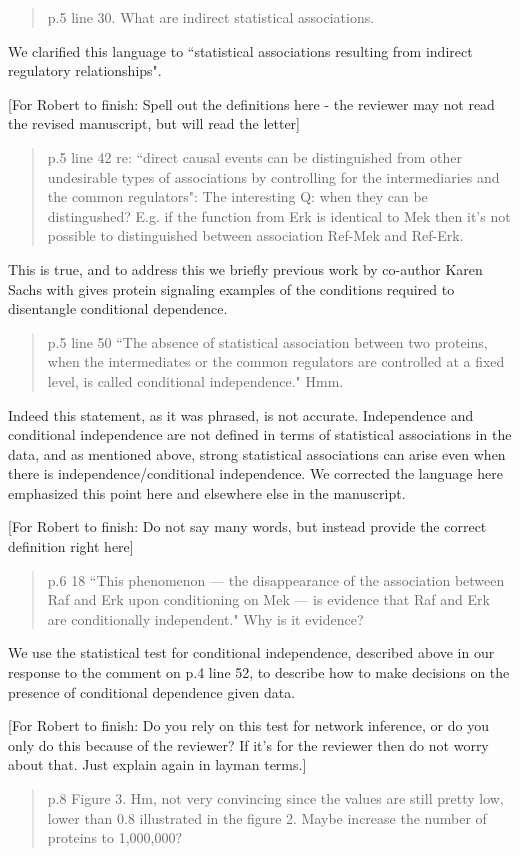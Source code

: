 \documentclass{letter}[11]
\def\todo#1{{\color{red}[For Robert to finish: #1]}}
\def\r#1{{\begin{quote}\textsf{\color{blue} #1}\end{quote}}}
\begin{document}
\r{p.5 line 30.  What are indirect statistical associations.}

We clarified this language to ``statistical associations resulting from indirect regulatory relationships".

\todo{Spell out the definitions here - the reviewer may not read the revised manuscript, but will read the letter}


\r{p.5 line 42 re: ``direct causal events can be distinguished from other undesirable types of associations by controlling for the intermediaries and the common regulators":  The interesting Q: when they can be distingushed? E.g. if the function from Erk is identical to Mek then it's not possible to distinguished between association Ref-Mek and Ref-Erk.}

This is true, and to address this we briefly previous work by co-author Karen Sachs with gives protein signaling examples of the conditions required to disentangle conditional dependence.

\r{p.5 line 50 ``The absence of statistical association between two proteins, when the intermediates or the common regulators are controlled at a fixed level, is called conditional independence." Hmm.}

Indeed this statement, as it was phrased, is not accurate.  Independence and conditional independence are not defined in terms of statistical associations in the data, and as mentioned above, strong statistical associations can arise even when there is independence/conditional independence.  We corrected the language here emphasized this point here and elsewhere else in the manuscript.

\todo{Do not say many words, but instead provide the correct definition right here}

\r{p.6 18 ``This phenomenon --- the disappearance of the association between Raf and Erk upon conditioning on Mek --- is evidence that Raf and Erk are conditionally independent."  Why is it evidence?}

We use the statistical test for conditional independence, described above in our response to the comment on p.4 line 52, to describe how to make decisions on the presence of conditional dependence  given data.

\todo{Do you rely on this test for network inference, or do you only do this because of the reviewer? If it's for the reviewer then do not worry about that. Just explain again in layman terms.}

\r{p.8 Figure 3.  Hm, not very convincing since the values are still pretty low, lower than 0.8 illustrated in the figure 2. Maybe increase the number of proteins to 1,000,000?}
\end{document}
